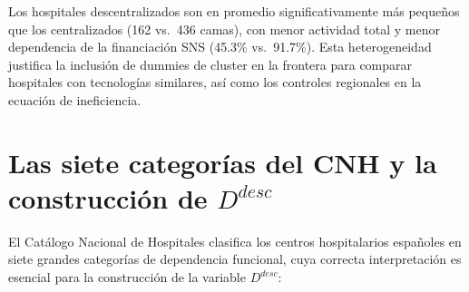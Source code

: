 \documentclass[12pt, a4paper, twoside, openright]{book}
\theoremstyle{plain}
\theoremstyle{definition}
\theoremstyle{remark}
\begin{document}
Los hospitales descentralizados son en promedio significativamente más pequeños que los centralizados (162 vs.\ 436 camas), con menor actividad total y menor dependencia de la financiación SNS (45.3\% vs.\ 91.7\%). Esta heterogeneidad justifica la inclusión de dummies de cluster en la frontera para comparar hospitales con tecnologías similares, así como los controles regionales en la ecuación de ineficiencia.

\section{Las siete categorías del CNH y la construcción de \texorpdfstring{$D^{desc}$}{D\^{}desc}}
\label{sec:categorias_cnh}

El Catálogo Nacional de Hospitales clasifica los centros hospitalarios españoles en siete grandes categorías de dependencia funcional, cuya correcta interpretación es esencial para la construcción de la variable $D^{desc}$:
\end{document}
